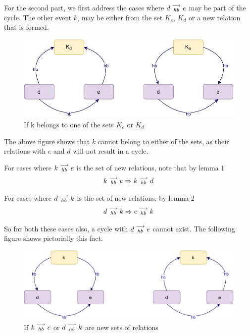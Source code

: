     For the second part, we first address the cases where $d\stackrel{\longrightarrow}{_{hb}}e$ may be part of the cycle. The other event $k$, may be either from the set $K_e$, $K_d$ or a new relation that is formed.

    \begin{figure}[H]
        \centering
        \includegraphics[scale=0.7]{InstructionReordering/ValidReorderingProof/ProofParts/Part3/part3(b).pdf}
        \caption{If k belongs to one of the sets $K_e$ or $K_d$}
        \label{fig:my_label}
    \end{figure}

    The above figure shows that $k$ cannot belong to either of the sets, as their relations with $e$ and $d$ will not result in a cycle. 

    For cases where $k\stackrel{\longrightarrow}{_{hb}}e$ is the set of new relations, note that by lemma 1
    \[
        k\stackrel{\longrightarrow}{_{hb}}e \Rightarrow k\stackrel{\longrightarrow}{_{hb}}d
    \]

    For cases where $d\stackrel{\longrightarrow}{_{hb}}k$ is the set of new relations, by lemma 2
    \[
        d\stackrel{\longrightarrow}{_{hb}}k \Rightarrow e\stackrel{\longrightarrow}{_{hb}}k
    \]

    So for both these cases also, a cycle with $d\stackrel{\longrightarrow}{_{hb}}e$ cannot exist. The following figure shows pictorially this fact. 
    \begin{figure}[H]
        \centering
        \includegraphics[scale=0.7]{InstructionReordering/ValidReorderingProof/ProofParts/Part3/part3(c).pdf}
        \caption{If $k\stackrel{\longrightarrow}{_{hb}}e$ or $d\stackrel{\longrightarrow}{_{hb}}k$ are new sets of relations}
        \label{fig:my_label}
    \end{figure}

